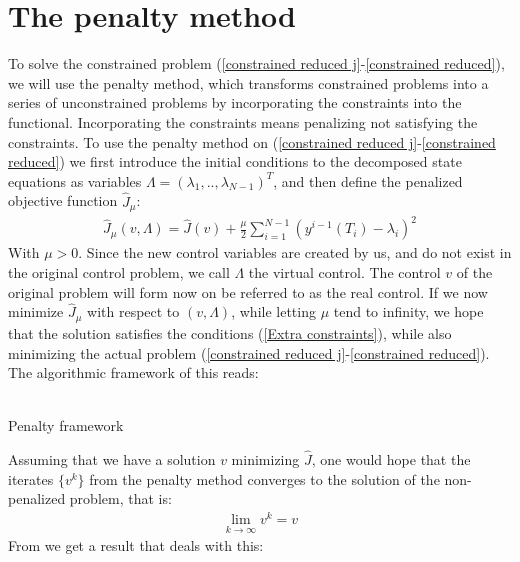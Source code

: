 \section{The penalty method} \label{penalty_sec}
To solve the constrained problem (\ref{constrained reduced j}-\ref{constrained reduced}), we will use the penalty method\cite{nocedal2006numerical}, which transforms constrained problems into a series of unconstrained problems by incorporating the constraints into the functional. Incorporating the constraints means penalizing not satisfying the constraints. To use the penalty method on (\ref{constrained reduced j}-\ref{constrained reduced}) we first introduce the initial conditions to the decomposed state equations as variables $\Lambda = (\lambda_1,..,\lambda_{N-1})^T$, and then define the penalized objective function $\hat J_{\mu}$:
\begin{align}
\hat J_{\mu}(v,\Lambda) = \hat J(v) + \frac{\mu}{2}\sum_{i=1}^{N-1}(y^{i-1}(T_i)-\lambda_i)^2 \label{pen_obj_J}
\end{align}
With $\mu>0$. Since the new control variables are created by us, and do not exist in the original control problem, we call $\Lambda$ the virtual control. The control $v$ of the original problem will form now on be referred to as the real control. If we now minimize $\hat{J}_{\mu}$ with respect to $(v,\Lambda)$, while letting $\mu$ tend to infinity, we hope that the solution satisfies the conditions (\ref{Extra constraints}), while also minimizing the actual problem (\ref{constrained reduced j}-\ref{constrained reduced}). The algorithmic framework of this reads:
\\
\\
\begin{algorithm}[H]
\caption{Penalty framework\label{PEN_ALG}}
\end{algorithm}
\noindent
Assuming that we have a solution $v$ minimizing $\hat J$, one would hope that the iterates $\{v^k\}$ from the penalty method converges to the solution of the non-penalized problem, that is:
\begin{align*}
\lim_{k\rightarrow \infty} v^k =v
\end{align*}
From \cite{nocedal2006numerical} we get a result that deals with this:
